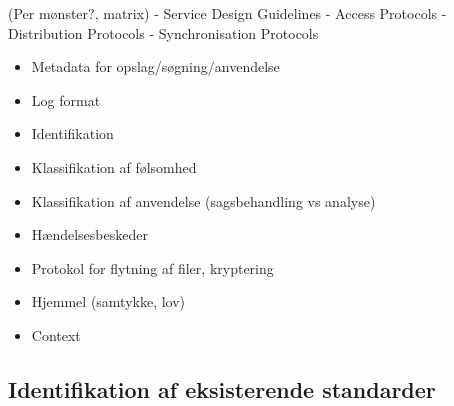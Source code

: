 (Per mønster?, matrix) - Service Design Guidelines - Access Protocols -
Distribution Protocols - Synchronisation Protocols

\begin{itemize}
\tightlist
\item
  Metadata for opslag/søgning/anvendelse
\item
  Log format
\item
  Identifikation
\item
  Klassifikation af følsomhed
\item
  Klassifikation af anvendelse (sagsbehandling vs analyse)
\item
  Hændelsesbeskeder
\item
  Protokol for flytning af filer, kryptering
\item
  Hjemmel (samtykke, lov)
\item
  Context
\end{itemize}

\subsection{Identifikation af eksisterende
standarder}\label{identifikation-af-eksisterende-standarder}

